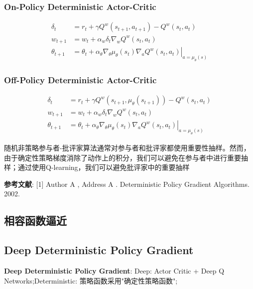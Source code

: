 \documentclass{article}
\begin{document}
        \subsubsection{On-Policy Deterministic Actor-Critic}
            \begin{align*}
                \delta_{t} &=r_{t}+\gamma Q^{w}\left(s_{t+1}, a_{t+1}\right)-Q^{w}\left(s_{t}, a_{t}\right) \\
                w_{t+1} &=w_{t}+\alpha_{w} \delta_{t} \nabla_{w} Q^{w}\left(s_{t}, a_{t}\right) \\
                \theta_{t+1} &=\theta_{t}+\left.\alpha_{\theta} \nabla_{\theta} \mu_{\theta}\left(s_{t}\right) \nabla_{a} Q^{w}\left(s_{t}, a_{t}\right)\right|_{a=\mu_{\theta}(s)}
            \end{align*}
            

        
        \subsubsection{Off-Policy Deterministic Actor-Critic}
            \begin{align*}
                \delta_{t} &=r_{t}+\gamma Q^{w}\left(s_{t+1}, \mu_{\theta}\left(s_{t+1}\right)\right)-Q^{w}\left(s_{t}, a_{t}\right) \\
                w_{t+1} &=w_{t}+\alpha_{w} \delta_{t} \nabla_{w} Q^{w}\left(s_{t}, a_{t}\right) \\
                \theta_{t+1} &=\theta_{t}+\left.\alpha_{\theta} \nabla_{\theta} \mu_{\theta}\left(s_{t}\right) \nabla_{a} Q^{w}\left(s_{t}, a_{t}\right)\right|_{a=\mu_{\theta}(s)}
            \end{align*}
            
            随机非策略参与者-批评家算法通常对参与者和批评家都使用重要性抽样。然而，由于确定性策略梯度消除了动作上的积分，我们可以避免在参与者中进行重要抽样；通过使用Q-learning，我们可以避免批评家中的重要抽样
            
        \textbf{参考文献}: [1] Author A , Address A . Deterministic Policy Gradient Algorithms. 2002.
            
    \subsection{相容函数逼近}
        
    \subsection{Deep Deterministic Policy Gradient}
        \textbf{Deep Deterministic Policy Gradient}: Deep: Actor Critic + Deep Q Networks;\quad Deterministic: 策略函数采用"确定性策略函数";
    
\end{document}
